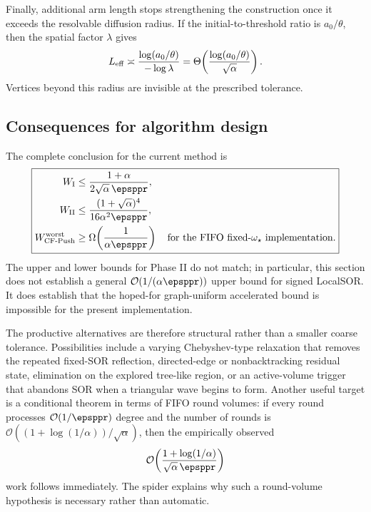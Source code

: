 Finally, additional arm length stops strengthening the construction once it
exceeds the resolvable diffusion radius.  If the initial-to-threshold ratio is
\(a_0/\theta\), then the spatial factor \(\lambda\) gives
\begin{equation}
    L_{\rm eff}
    \asymp
    \frac{\log(a_0/\theta)}{-\log\lambda}
    =\Theta\!\left(
       \frac{\log(a_0/\theta)}{\sqrt\alpha}
      \right).
    \label{eq:cf-effective-radius}
\end{equation}
Vertices beyond this radius are invisible at the prescribed tolerance.

\subsection{Consequences for algorithm design}
\label{subsec:cf-design-consequences}

The complete conclusion for the current method is
\begin{equation}
    \boxed{
    \begin{aligned}
    W_{\rm I}
        &\leq\frac{1+\alpha}{2\sqrt\alpha\,\epsppr},\\
    W_{\rm II}
        &\leq\frac{(1+\sqrt\alpha)^4}{16\alpha^2\epsppr},\\
    W_{\rm CF\text{-}Push}^{\rm worst}
        &\geq\Omega\!\left(\frac{1}{\alpha\epsppr}\right)
        \quad\text{for the FIFO fixed-\(\omega_\star\) implementation.}
    \end{aligned}}
    \label{eq:cf-final-summary}
\end{equation}
The upper and lower bounds for Phase II do not match; in particular, this
section does not establish a general
\(\mathcal O(1/(\alpha\epsppr))\) upper bound for signed LocalSOR.  It does
establish that the hoped-for graph-uniform accelerated bound is impossible for
the present implementation.

The productive alternatives are therefore structural rather than a smaller
coarse tolerance.  Possibilities include a varying Chebyshev-type relaxation
that removes the repeated fixed-SOR reflection, directed-edge or
nonbacktracking residual state, elimination on the explored tree-like region,
or an active-volume trigger that abandons SOR when a triangular wave begins to
form.  Another useful target is a conditional theorem in terms of FIFO round
volumes: if every round processes \(\mathcal O(1/\epsppr)\) degree and the
number of rounds is
\(\mathcal O((1+\log(1/\alpha))/\sqrt\alpha)\), then the empirically observed
\begin{equation}
    \mathcal O\!\left(
      \frac{1+\log(1/\alpha)}{\sqrt\alpha\,\epsppr}
    \right)
    \label{eq:cf-conditional-flat-volume}
\end{equation}
work follows immediately.  The spider explains why such a round-volume
hypothesis is necessary rather than automatic.

